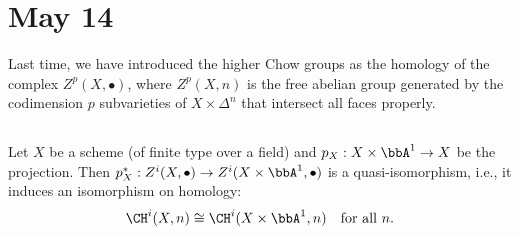 \section{May 14}

Last time, we have introduced the higher Chow groups as the homology of the complex $Z^p(X, \bullet)$,
where $Z^p(X, n)$ is the free abelian group generated by the codimension $p$ subvarieties of $X \times \Delta^n$ that intersect all faces properly.

\subsection{}

  \begin{theorem}
    Let $X$ be a scheme (of finite type over a field) and $p_X: X \times \bbA^1 \to X$ be the projection. 
    Then $p_X^*: Z^i(X, \bullet) \to Z^i(X \times \bbA^1, \bullet)$ is a quasi-isomorphism, i.e., it induces an isomorphism on homology:
    \[ \CH^i(X, n) \cong \CH^i(X \times \bbA^1, n) \quad \text{for all } n. \]
  \end{theorem}
